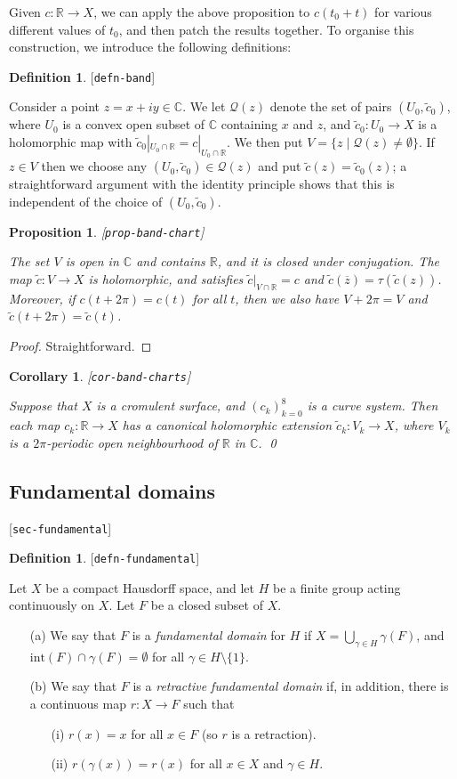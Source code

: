 \documentclass[reqno]{amsart}
\newcommand{\lbl}[1]{\label{#1}\textup{[\texttt{#1}]}\par}
\newcommand{\lbl}{\label}
\newcommand{\gm}        {\gamma}
\newcommand{\R}         {{\mathbb{R}}}
\newcommand{\C}         {{\mathbb{C}}}
\newcommand{\ov}[1]     {\overline{#1}}
\newcommand{\st}        {\;|\;}
\newcommand{\sm}        {\setminus}
\newcommand{\tc}	{\widetilde{c}}
\newcommand{\CQ}        {\mathcal{Q}}
\renewcommand{\:}{\colon}
\newtheorem{proposition}[theorem]{Proposition}
\newtheorem{corollary}[theorem]{Corollary}
\theoremstyle{definition}
\newtheorem{definition}[theorem]{Definition}
\begin{document}
Given $c\:\R\to X$, we can apply the above proposition to $c(t_0+t)$
for various different values of $t_0$, and then patch the results
together.  To organise this construction, we introduce the
following definitions:
\begin{definition}\lbl{defn-band}
 Consider a point $z=x+iy\in\C$.  We let $\CQ(z)$ denote the set of
 pairs $(U_0,\tc_0)$, where $U_0$ is a convex open subset of $\C$
 containing $x$ and $z$, and $\tc_0\:U_0\to X$ is a holomorphic map with
 $\tc_0|_{U_0\cap\R}=c|_{U_0\cap\R}$.  We then put
 $V=\{z\st\CQ(z)\neq\emptyset\}$.  If $z\in V$ then we choose any
 $(U_0,\tc_0)\in\CQ(z)$ and put $\tc(z)=\tc_0(z)$; a straightforward
 argument with the identity principle shows that this is independent
 of the choice of $(U_0,\tc_0)$.
\end{definition}

\begin{proposition}\lbl{prop-band-chart}
 The set $V$ is open in $\C$ and contains $\R$, and it is closed under
 conjugation.  The map $\tc\:V\to X$ is holomorphic, and satisfies
 $\tc|_{V\cap\R}=c$ and $\tc(\ov{z})=\tau(\tc(z))$.  Moreover, if
 $c(t+2\pi)=c(t)$ for all $t$, then we also have $V+2\pi=V$ and
 $\tc(t+2\pi)=\tc(t)$.
\end{proposition}
\begin{proof}
 Straightforward.
\end{proof}

\begin{corollary}\lbl{cor-band-charts}
 Suppose that $X$ is a cromulent surface, and $(c_k)_{k=0}^8$ is a
 curve system.  Then each map $c_k\:\R\to X$ has a canonical
 holomorphic extension $\tc_k\:V_k\to X$, where $V_k$ is a
 $2\pi$-periodic open neighbourhood of $\R$ in $\C$. \qed
\end{corollary}

\subsection{Fundamental domains}
\lbl{sec-fundamental}

\begin{definition}\lbl{defn-fundamental}
 Let $X$ be a compact Hausdorff space, and let $H$ be a finite group acting
 continuously on $X$.  Let $F$ be a closed subset of $X$.
 \begin{itemize}
  \item[(a)] We say that $F$ is a \emph{fundamental domain} for $H$ if
   $X=\bigcup_{\gm\in H}\gm(F)$, and $\text{int}(F)\cap\gm(F)=\emptyset$
   for all $\gm\in H\sm\{1\}$.
  \item[(b)] We say that $F$ is a \emph{retractive fundamental domain} if,
   in addition, there is a continuous map $r\:X\to F$ such that
   \begin{itemize}
    \item[(i)] $r(x)=x$ for all $x\in F$ (so $r$ is a retraction).
    \item[(ii)] $r(\gm(x))=r(x)$ for all $x\in X$ and $\gm\in H$.
   \end{itemize}
 \end{itemize}
\end{definition}
\end{document}
